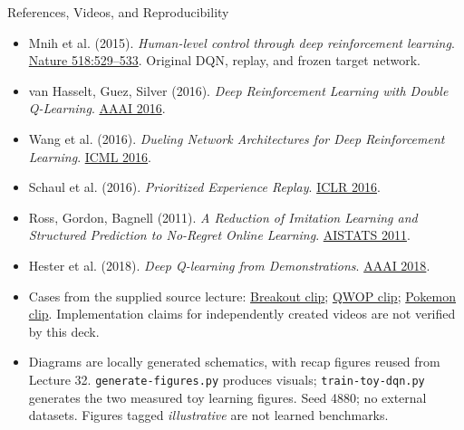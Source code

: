 \documentclass[aspectratio=169,10pt]{beamer}
\begin{document}
\begin{frame}{References, Videos, and Reproducibility}
\scriptsize
\begin{itemize}
\item Mnih et al. (2015). \emph{Human-level control through deep reinforcement learning}. \href{https://doi.org/10.1038/nature14236}{Nature 518:529--533}. Original DQN, replay, and frozen target network.
\item van Hasselt, Guez, Silver (2016). \emph{Deep Reinforcement Learning with Double Q-Learning}. \href{https://doi.org/10.1609/aaai.v30i1.10295}{AAAI 2016}.
\item Wang et al. (2016). \emph{Dueling Network Architectures for Deep Reinforcement Learning}. \href{https://proceedings.mlr.press/v48/wangf16.html}{ICML 2016}.
\item Schaul et al. (2016). \emph{Prioritized Experience Replay}. \href{https://arxiv.org/abs/1511.05952}{ICLR 2016}.
\item Ross, Gordon, Bagnell (2011). \emph{A Reduction of Imitation Learning and Structured Prediction to No-Regret Online Learning}. \href{https://proceedings.mlr.press/v15/ross11a.html}{AISTATS 2011}.
\item Hester et al. (2018). \emph{Deep Q-learning from Demonstrations}. \href{https://doi.org/10.1609/aaai.v32i1.11757}{AAAI 2018}.
\item Cases from the supplied source lecture: \href{https://www.youtube.com/watch?v=V1eYniJ0Rnk}{Breakout clip}; \href{https://www.youtube.com/watch?v=82sTpO_EpEc}{QWOP clip}; \href{https://www.youtube.com/watch?v=DcYLT37ImBY}{Pokemon clip}. Implementation claims for independently created videos are not verified by this deck.
\item Diagrams are locally generated schematics, with recap figures reused from Lecture 32. \texttt{generate-figures.py} produces visuals; \texttt{train-toy-dqn.py} generates the two measured toy learning figures. Seed 4880; no external datasets. Figures tagged \emph{illustrative} are not learned benchmarks.
\end{itemize}
\end{frame}
\end{document}
